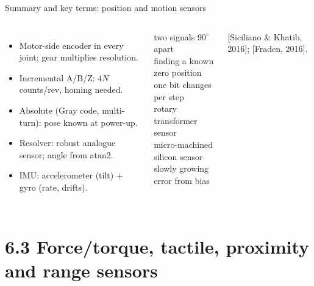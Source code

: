 \documentclass[aspectratio=169,10pt]{beamer}
\begin{document}
\begin{frame}{Summary and key terms: position and motion sensors}
\begin{columns}[T]
\begin{itemize}\small
\item Motor-side encoder in every joint; gear multiplies resolution.
\item Incremental A/B/Z: $4N$ counts/rev, homing needed.
\item Absolute (Gray code, multi-turn): pose known at power-up.
\item Resolver: robust analogue sensor; angle from atan2.
\item IMU: accelerometer (tilt) $+$ gyro (rate, drifts).
\end{itemize}
\begin{defbox}
\small
{} two signals $90^\circ$ apart\\
 finding a known zero position\\
 one bit changes per step\\
 rotary transformer sensor\\
 micro-machined silicon sensor\\
 slowly growing error from bias
\end{defbox}
{\scriptsize\color{mkGray} [Siciliano \& Khatib, 2016]; [Fraden, 2016].}
\end{columns}
\end{frame}

\section{6.3 Force/torque, tactile, proximity and range sensors}
\end{document}
